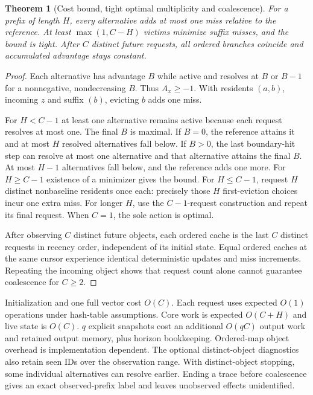\documentclass[11pt,letterpaper]{article}
\newtheorem{theorem}{Theorem}
\begin{document}
\begin{theorem}[Cost bound, tight optimal multiplicity and coalescence]
For a prefix of length \(H\), every alternative adds at most one miss relative to the reference. At least \(\max(1,C-H)\) victims minimize suffix misses, and the bound is tight. After \(C\) distinct future requests, all ordered branches coincide and accumulated advantage stays constant.
\end{theorem}
\begin{proof}
Each alternative has advantage \(B\) while active and resolves at \(B\) or \(B-1\) for a nonnegative, nondecreasing \(B\). Thus \(A_x\ge-1\). With residents \((a,b)\), incoming \(z\) and suffix \((b)\), evicting \(b\) adds one miss.

For \(H<C-1\) at least one alternative remains active because each request resolves at most one. The final \(B\) is maximal. If \(B=0\), the reference attains it and at most \(H\) resolved alternatives fall below. If \(B>0\), the last boundary-hit step can resolve at most one alternative and that alternative attains the final \(B\). At most \(H-1\) alternatives fall below, and the reference adds one more. For \(H\ge C-1\) existence of a minimizer gives the bound. For \(H\le C-1\), request \(H\) distinct nonbaseline residents once each: precisely those \(H\) first-eviction choices incur one extra miss. For longer \(H\), use the \(C-1\)-request construction and repeat its final request. When \(C=1\), the sole action is optimal.

After observing \(C\) distinct future objects, each ordered cache is the last \(C\) distinct requests in recency order, independent of its initial state. Equal ordered caches at the same cursor experience identical deterministic updates and miss increments. Repeating the incoming object shows that request count alone cannot guarantee coalescence for \(C\ge2\).
\end{proof}

Initialization and one full vector cost \(O(C)\). Each request uses expected \(O(1)\) operations under hash-table assumptions. Core work is expected \(O(C+H)\) and live state is \(O(C)\). \(q\) explicit snapshots cost an additional \(O(qC)\) output work and retained output memory, plus horizon bookkeeping. Ordered-map object overhead is implementation dependent. The optional distinct-object diagnostics also retain seen IDs over the observation range. With distinct-object stopping, some individual alternatives can resolve earlier. Ending a trace before coalescence gives an exact observed-prefix label and leaves unobserved effects unidentified.
\end{document}
